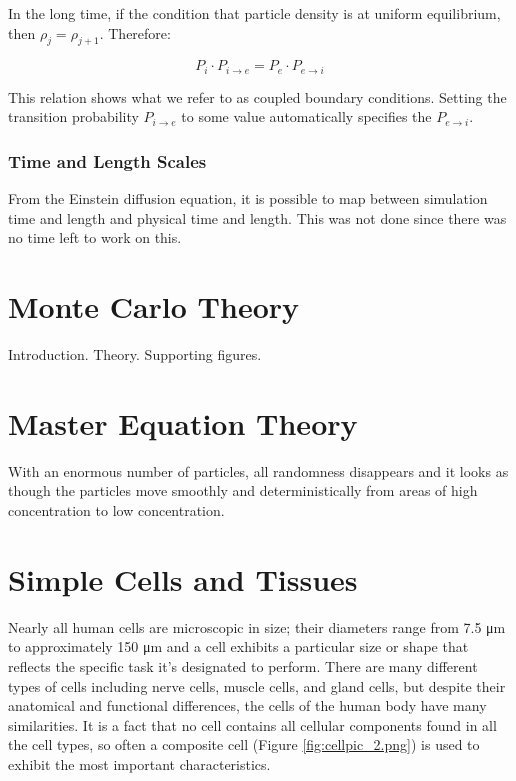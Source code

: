 	In the long time, if the condition that particle density is at uniform equilibrium, then  $\rho_{j} = \rho_{j+1} $. Therefore:
	
	\begin{equation}
		P_{i} \cdot P_{i \rightarrow e} = P_{e} \cdot P_{e \rightarrow i}
	\end{equation}
	
	This relation shows what we refer to as coupled boundary conditions. Setting the transition probability $ P_{i \rightarrow e} $ to some value automatically specifies the $ P_{e \rightarrow i} $.

\subsubsection{Time and Length Scales}

	From the Einstein diffusion equation, it is possible to map between simulation time and length and physical time and length. This was not done since there was no time left to work on this.

\section{Monte Carlo Theory}
\label{sec:intro-mc}
	Introduction.
	Theory.
	Supporting figures.


\section{Master Equation Theory}
\label{sec:intro-me}
	With an enormous number of particles, all randomness disappears and it looks as though the particles move smoothly and deterministically from areas of high concentration to low concentration.

\section{Simple Cells and Tissues}
\label{sec:intro-cells}
	Nearly all human cells are microscopic in size; their diameters range from 7.5 \si{\micro\meter} to approximately 150 \si{\micro\meter} and a cell exhibits a particular size or shape that reflects the specific task it's designated to perform. There are many different types of cells including nerve cells, muscle cells, and gland cells, but despite their anatomical and functional differences, the cells of the human body have many similarities. It is a fact that no cell contains all cellular components found in all the cell types, so often a composite cell (Figure {\ref{fig:cellpic_2.png}}) is used to exhibit the most important characteristics. 

